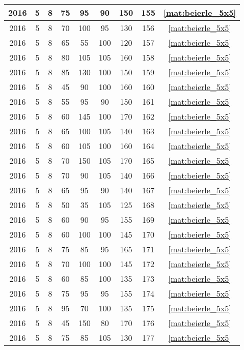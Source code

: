 \begin{longtable}{|c|c|c|c|c|c|c|c|c|}
2016 & 5 & 8 & 75 & 95 & 90 & 150 & 155 & \eqref{mat:beierle_5x5} \\ \hline 
2016 & 5 & 8 & 70 & 100 & 95 & 130 & 156 & \eqref{mat:beierle_5x5} \\ \hline 
2016 & 5 & 8 & 65 & 55 & 100 & 120 & 157 & \eqref{mat:beierle_5x5} \\ \hline 
2016 & 5 & 8 & 80 & 105 & 105 & 160 & 158 & \eqref{mat:beierle_5x5} \\ \hline 
2016 & 5 & 8 & 85 & 130 & 100 & 150 & 159 & \eqref{mat:beierle_5x5} \\ \hline 
2016 & 5 & 8 & 45 & 90 & 100 & 160 & 160 & \eqref{mat:beierle_5x5} \\ \hline 
2016 & 5 & 8 & 55 & 95 & 90 & 150 & 161 & \eqref{mat:beierle_5x5} \\ \hline 
2016 & 5 & 8 & 60 & 145 & 100 & 170 & 162 & \eqref{mat:beierle_5x5} \\ \hline 
2016 & 5 & 8 & 65 & 100 & 105 & 140 & 163 & \eqref{mat:beierle_5x5} \\ \hline 
2016 & 5 & 8 & 60 & 105 & 100 & 160 & 164 & \eqref{mat:beierle_5x5} \\ \hline 
2016 & 5 & 8 & 70 & 150 & 105 & 170 & 165 & \eqref{mat:beierle_5x5} \\ \hline 
2016 & 5 & 8 & 70 & 90 & 105 & 140 & 166 & \eqref{mat:beierle_5x5} \\ \hline 
2016 & 5 & 8 & 65 & 95 & 90 & 140 & 167 & \eqref{mat:beierle_5x5} \\ \hline 
2016 & 5 & 8 & 50 & 35 & 105 & 125 & 168 & \eqref{mat:beierle_5x5} \\ \hline 
2016 & 5 & 8 & 60 & 90 & 95 & 155 & 169 & \eqref{mat:beierle_5x5} \\ \hline 
2016 & 5 & 8 & 60 & 100 & 100 & 145 & 170 & \eqref{mat:beierle_5x5} \\ \hline 
2016 & 5 & 8 & 75 & 85 & 95 & 165 & 171 & \eqref{mat:beierle_5x5} \\ \hline 
2016 & 5 & 8 & 70 & 100 & 100 & 145 & 172 & \eqref{mat:beierle_5x5} \\ \hline 
2016 & 5 & 8 & 60 & 85 & 100 & 135 & 173 & \eqref{mat:beierle_5x5} \\ \hline 
2016 & 5 & 8 & 75 & 95 & 95 & 155 & 174 & \eqref{mat:beierle_5x5} \\ \hline 
2016 & 5 & 8 & 95 & 70 & 100 & 135 & 175 & \eqref{mat:beierle_5x5} \\ \hline 
2016 & 5 & 8 & 45 & 150 & 80 & 170 & 176 & \eqref{mat:beierle_5x5} \\ \hline 
2016 & 5 & 8 & 75 & 85 & 105 & 130 & 177 & \eqref{mat:beierle_5x5} \\ \hline 

\end{longtable}
